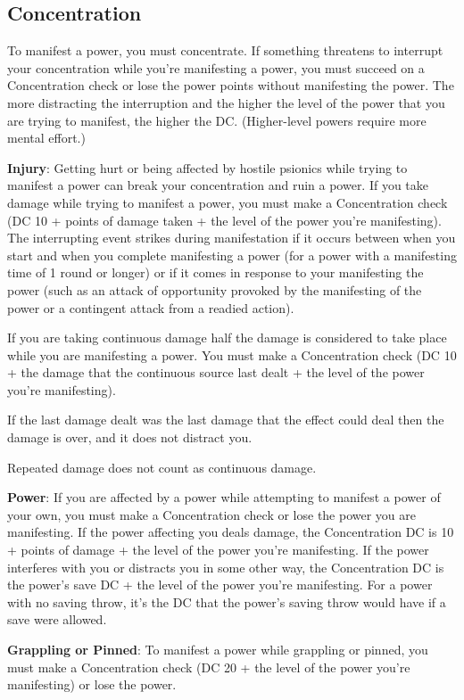 \subsection{Concentration}
To manifest a power, you must concentrate. If something threatens to interrupt your concentration while you're manifesting a power, you must succeed on a Concentration check or lose the power points without manifesting the power. The more distracting the interruption and the higher the level of the power that you are trying to manifest, the higher the DC. (Higher-level powers require more mental effort.)

\textbf{Injury}: Getting hurt or being affected by hostile psionics while trying to manifest a power can break your concentration and ruin a power. If you take damage while trying to manifest a power, you must make a Concentration check (DC 10 + points of damage taken + the level of the power you're manifesting). The interrupting event strikes during manifestation if it occurs between when you start and when you complete manifesting a power (for a power with a manifesting time of 1 round or longer) or if it comes in response to your manifesting the power (such as an attack of opportunity provoked by the manifesting of the power or a contingent attack from a readied action).

If you are taking continuous damage half the damage is considered to take place while you are manifesting a power. You must make a Concentration check (DC 10 + \onehalf the damage that the continuous source last dealt + the level of the power you're manifesting).

If the last damage dealt was the last damage that the effect could deal then the damage is over, and it does not distract you.

Repeated damage does not count as continuous damage.

\textbf{Power}: If you are affected by a power while attempting to manifest a power of your own, you must make a Concentration check or lose the power you are manifesting. If the power affecting you deals damage, the Concentration DC is 10 + points of damage + the level of the power you're manifesting. If the power interferes with you or distracts you in some other way, the Concentration DC is the power's save DC + the level of the power you're manifesting. For a power with no saving throw, it's the DC that the power's saving throw would have if a save were allowed.

\textbf{Grappling or Pinned}: To manifest a power while grappling or pinned, you must make a Concentration check (DC 20 + the level of the power you're manifesting) or lose the power.

